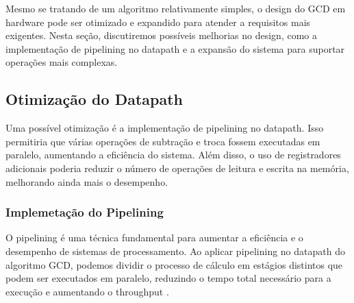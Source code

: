 \documentclass[a4paper,11pt]{article} %
\begin{document}
Mesmo se tratando de um algoritmo relativamente simples, o design do GCD em hardware pode ser otimizado e expandido para atender a requisitos mais exigentes. Nesta seção, discutiremos possíveis melhorias no design, como a implementação de pipelining no datapath e a expansão do sistema para suportar operações mais complexas.




\subsection{Otimização do Datapath}
Uma possível otimização é a implementação de pipelining no datapath. Isso permitiria que várias operações de subtração e troca fossem executadas em paralelo, aumentando a eficiência do sistema. Além disso, o uso de registradores adicionais poderia reduzir o número de operações de leitura e escrita na memória, melhorando ainda mais o desempenho.


\subsubsection{Implemetação do Pipelining}
O pipelining é uma técnica fundamental para aumentar a eficiência e o desempenho de sistemas de processamento. Ao aplicar pipelining no datapath do algoritmo GCD, podemos dividir o processo de cálculo em estágios distintos que podem ser executados em paralelo, reduzindo o tempo total necessário para a execução e aumentando o throughput \cite{Hennessy2017}.
\end{document}
